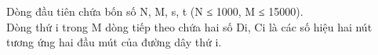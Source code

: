 Dòng đầu tiên chứa bốn số N, M, s, t (N ≤ 1000, M ≤ 15000).
\\Dòng thứ i trong M dòng tiếp theo chứa hai số Di, Ci là các số hiệu hai nút tương ứng hai đầu mút của đường dây thứ i.